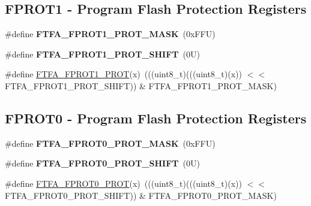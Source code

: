 \subsection*{F\+P\+R\+O\+T1 -\/ Program Flash Protection Registers}
\begin{DoxyCompactItemize}
\item 
\mbox{\label{group___f_t_f_a___register___masks_gaffbe916c9df3b3d7f04288d9d9746c50}} 
\#define {\bfseries F\+T\+F\+A\+\_\+\+F\+P\+R\+O\+T1\+\_\+\+P\+R\+O\+T\+\_\+\+M\+A\+SK}~(0x\+F\+F\+U)
\item 
\mbox{\label{group___f_t_f_a___register___masks_ga1b5389e270a3438c9501d785ac868461}} 
\#define {\bfseries F\+T\+F\+A\+\_\+\+F\+P\+R\+O\+T1\+\_\+\+P\+R\+O\+T\+\_\+\+S\+H\+I\+FT}~(0\+U)
\item 
\#define \mbox{\hyperlink{group___f_t_f_a___register___masks_ga97491955c7e87b9a1d0163ffb8f335cd}{F\+T\+F\+A\+\_\+\+F\+P\+R\+O\+T1\+\_\+\+P\+R\+OT}}(x)~(((uint8\+\_\+t)(((uint8\+\_\+t)(x)) $<$$<$ F\+T\+F\+A\+\_\+\+F\+P\+R\+O\+T1\+\_\+\+P\+R\+O\+T\+\_\+\+S\+H\+I\+FT)) \& F\+T\+F\+A\+\_\+\+F\+P\+R\+O\+T1\+\_\+\+P\+R\+O\+T\+\_\+\+M\+A\+SK)
\end{DoxyCompactItemize}
\subsection*{F\+P\+R\+O\+T0 -\/ Program Flash Protection Registers}
\begin{DoxyCompactItemize}
\item 
\mbox{\label{group___f_t_f_a___register___masks_gac41f6c8343a42460ae9e13a58b2e7af5}} 
\#define {\bfseries F\+T\+F\+A\+\_\+\+F\+P\+R\+O\+T0\+\_\+\+P\+R\+O\+T\+\_\+\+M\+A\+SK}~(0x\+F\+F\+U)
\item 
\mbox{\label{group___f_t_f_a___register___masks_gaeaea51b92cd5019f8909242cc90e2050}} 
\#define {\bfseries F\+T\+F\+A\+\_\+\+F\+P\+R\+O\+T0\+\_\+\+P\+R\+O\+T\+\_\+\+S\+H\+I\+FT}~(0\+U)
\item 
\#define \mbox{\hyperlink{group___f_t_f_a___register___masks_ga33708b3fd4d704e72fef148e18c137f5}{F\+T\+F\+A\+\_\+\+F\+P\+R\+O\+T0\+\_\+\+P\+R\+OT}}(x)~(((uint8\+\_\+t)(((uint8\+\_\+t)(x)) $<$$<$ F\+T\+F\+A\+\_\+\+F\+P\+R\+O\+T0\+\_\+\+P\+R\+O\+T\+\_\+\+S\+H\+I\+FT)) \& F\+T\+F\+A\+\_\+\+F\+P\+R\+O\+T0\+\_\+\+P\+R\+O\+T\+\_\+\+M\+A\+SK)
\end{DoxyCompactItemize}


